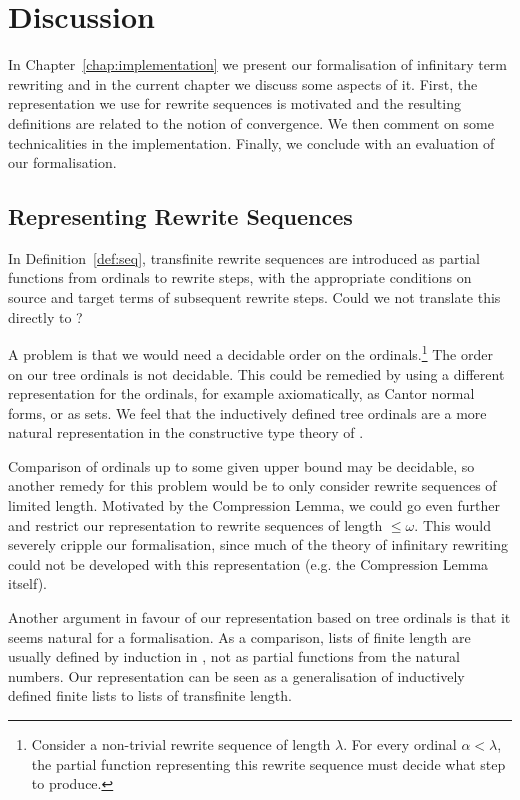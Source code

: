 \chapter{Discussion}\label{chap:discussion}

In Chapter~\ref{chap:implementation} we present our formalisation of
infinitary term rewriting and in the current chapter we discuss some
aspects of it. First, the representation we use for rewrite sequences
is motivated and the resulting definitions are related to the notion
of convergence. We then comment on some technicalities in the
implementation. Finally, we conclude with an evaluation of our
formalisation.


\section{Representing Rewrite Sequences}

In Definition~\ref{def:seq}, transfinite rewrite sequences are
introduced as partial functions from ordinals to rewrite steps, with
the appropriate conditions on source and target terms of subsequent
rewrite steps. Could we not translate this directly to \Coq?

A problem is that we would need a decidable order on the
ordinals.\footnote{Consider a non-trivial rewrite sequence of length
  $\lambda$. For every ordinal $\alpha < \lambda$, the partial
  function representing this rewrite sequence must decide what step to
  produce.}
The order on our tree ordinals is not decidable. This could be
remedied by using a different representation for the ordinals, for
example axiomatically, as Cantor normal forms, or as sets. We feel
that the inductively defined tree ordinals are a more natural
representation in the constructive type theory of \Coq.

Comparison of ordinals up to some given upper bound may be decidable,
so another remedy for this problem would be to only consider rewrite
sequences of limited length. Motivated by the Compression Lemma, we
could go even further and restrict our representation to rewrite
sequences of length $\le \omega$. This would severely cripple our
formalisation, since much of the theory of infinitary rewriting could
not be developed with this representation (e.g. the Compression Lemma
itself). %

Another argument in favour of our representation based on tree
ordinals is that it seems natural for a \Coq formalisation. As a
comparison, lists of finite length are usually defined by induction in
\Coq, not as partial functions from the natural numbers. Our
representation can be seen as a generalisation of inductively defined
finite lists to lists of transfinite length.


